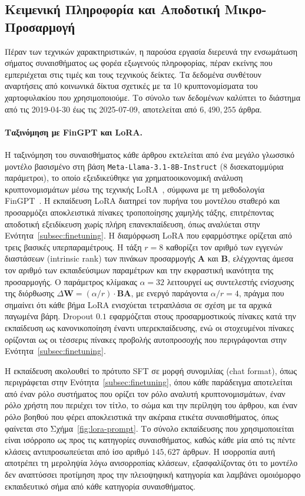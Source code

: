 \subsection{Κειμενική Πληροφορία και Αποδοτική Μικρο-Προσαρμογή}
\label{sec:sentiment-data}

Πέραν των τεχνικών χαρακτηριστικών, η παρούσα εργασία διερευνά την ενσωμάτωση
σήματος συναισθήματος ως φορέα εξωγενούς πληροφορίας, πέραν εκείνης που
εμπεριέχεται στις τιμές και τους τεχνικούς δείκτες. Τα δεδομένα συνθέτουν
αναρτήσεις από κοινωνικά δίκτυα σχετικές με τα 10 κρυπτονομίσματα του χαρτοφυλακίου που χρησιμοποιούμε.
Το σύνολο των δεδομένων καλύπτει το διάστημα από τις 2019-04-30 έως
τις 2025-07-09, αποτελείται από $6{,}490{,}255$ άρθρα.

\paragraph{Ταξινόμηση με FinGPT και LoRA.}
Η ταξινόμηση του συναισθήματος κάθε άρθρου εκτελείται από ένα μεγάλο γλωσσικό
μοντέλο βασισμένο στη βάση \texttt{Meta-Llama-3.1-8B-Instruct} (8 δισεκατομμύρια
παράμετροι), το οποίο εξειδικεύθηκε για χρηματοοικονομική ανάλυση κρυπτονομισμάτων
μέσω της τεχνικής LoRA~\cite{hu2021lora}, σύμφωνα με τη
μεθοδολογία FinGPT~\cite{yang2023fingpt}. Η εκπαίδευση LoRA διατηρεί τον πυρήνα
του μοντέλου σταθερό και προσαρμόζει αποκλειστικά πίνακες τροποποίησης χαμηλής
τάξης, επιτρέποντας αποδοτική εξειδίκευση χωρίς πλήρη επανεκπαίδευση, όπως
αναλύεται στην Ενότητα~\ref{subsec:finetuning}. Η διαμόρφωση LoRA που εφαρμόστηκε ορίζεται από τρεις βασικές υπερπαραμέτρους.
Η τάξη $r = 8$ καθορίζει τον αριθμό των εγγενών διαστάσεων (intrinsic rank) των
πινάκων προσαρμογής $\mathbf{A}$ και $\mathbf{B}$, ελέγχοντας άμεσα τον αριθμό
των εκπαιδεύσιμων παραμέτρων και την εκφραστική ικανότητα της προσαρμογής.
Ο παράμετρος κλίμακας $\alpha = 32$ λειτουργεί ως συντελεστής ενίσχυσης της
διόρθωσης $\Delta\mathbf{W} = (\alpha/r) \cdot \mathbf{B}\mathbf{A}$, με ενεργό
παράγοντα $\alpha/r = 4$, πράγμα που σημαίνει ότι κάθε βήμα LoRA ενισχύεται
τετραπλάσια σε σχέση με τα αρχικά παγωμένα βάρη. Dropout $0.1$ εφαρμόζεται
στους προσαρμοστικούς πίνακες κατά την εκπαίδευση ως κανονικοποίηση έναντι
υπερεκπαίδευσης, ενώ οι στοχευμένοι πίνακες ορίζονται ως οι τέσσερις πίνακες
προβολής αυτοπροσοχής που περιγράφονται στην Ενότητα~\ref{subsec:finetuning}.

Η εκπαίδευση ακολουθεί το πρότυπο SFT σε μορφή συνομιλίας (chat format),
όπως περιγράφεται στην Ενότητα~\ref{subsec:finetuning}, όπου κάθε παράδειγμα
αποτελείται από έναν ρόλο συστήματος που ορίζει τον ρόλο αναλυτή
κρυπτονομισμάτων, έναν ρόλο χρήστη που περιέχει τον τίτλο, το σώμα και
την περίληψη του άρθρου, και έναν ρόλο βοηθού που φέρει αποκλειστικά
την ακέραια ετικέτα συναισθήματος, όπως φαίνεται στο Σχήμα~\ref{fig:lora-prompt}.
Το σύνολο εκπαίδευσης που χρησιμοποιείται είναι ισόρροπο ως προς τις κατηγορίες συναισθήματος, 
καθώς κάθε μία από τις πέντε κλάσεις αντιπροσωπεύεται από ίσο αριθμό $145{,}627$ άρθρων. 
Η ισορροπία αυτή αποτρέπει τη μεροληψία λόγω ανισορροπίας κλάσεων, εξασφαλίζοντας 
ότι το μοντέλο δεν αναπτύσσει προτίμηση προς την πλειοψηφική κατηγορία και λαμβάνει 
ομοιόμορφο εκπαιδευτικό σήμα από κάθε κατηγορία συναισθήματος.

